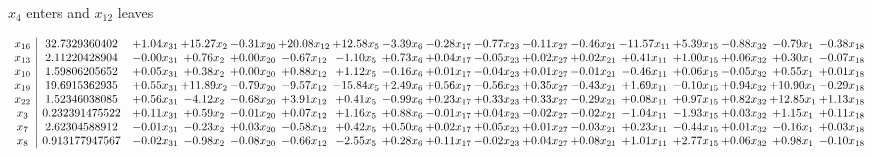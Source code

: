 \documentclass[9pt]{article}
\begin{document}
 $ x_{4} $ enters and $ x_{12} $ leaves 

 \[\begin{array}{c| c c@{\hskip 2pt} c@{\hskip 2pt} c@{\hskip 2pt} c@{\hskip 2pt} c@{\hskip 2pt} c@{\hskip 2pt} c@{\hskip 2pt} c@{\hskip 2pt} c@{\hskip 2pt} c@{\hskip 2pt} c@{\hskip 2pt} c@{\hskip 2pt} c@{\hskip 2pt} c@{\hskip 2pt} c@{\hskip 2pt} }
 x_{16}   &  32.7329360402 & +  1.04 x_{31} & + 15.27 x_{2} & -0.31 x_{20} & + 20.08 x_{12} & + 12.58 x_{5} & -3.39 x_{6} & -0.28 x_{17} & -0.77 x_{23} & -0.11 x_{27} & -0.46 x_{21} & -11.57 x_{11} & +  5.39 x_{15} & -0.88 x_{32} & -0.79 x_{1} & -0.38 x_{18}\\
 x_{13}   &  2.11220428904 & -0.00 x_{31} & +  0.76 x_{2} & +  0.00 x_{20} & -0.67 x_{12} & -1.10 x_{5} & +  0.73 x_{6} & +  0.04 x_{17} & -0.05 x_{23} & +  0.02 x_{27} & +  0.02 x_{21} & +  0.41 x_{11} & +  1.00 x_{15} & +  0.06 x_{32} & +  0.30 x_{1} & -0.07 x_{18}\\
 x_{10}   &  1.59806205652 & +  0.05 x_{31} & +  0.38 x_{2} & +  0.00 x_{20} & +  0.88 x_{12} & +  1.12 x_{5} & -0.16 x_{6} & +  0.01 x_{17} & -0.04 x_{23} & +  0.01 x_{27} & -0.01 x_{21} & -0.46 x_{11} & +  0.06 x_{15} & -0.05 x_{32} & +  0.55 x_{1} & +  0.01 x_{18}\\
 x_{19}   &  19.6915362935 & +  0.55 x_{31} & + 11.89 x_{2} & -0.79 x_{20} & -9.57 x_{12} & -15.84 x_{5} & +  2.49 x_{6} & +  0.56 x_{17} & -0.56 x_{23} & +  0.35 x_{27} & -0.43 x_{21} & +  1.69 x_{11} & -0.10 x_{15} & +  0.94 x_{32} & + 10.90 x_{1} & -0.29 x_{18}\\
 x_{22}   &  1.52346038085 & +  0.56 x_{31} & -4.12 x_{2} & -0.68 x_{20} & +  3.91 x_{12} & +  0.41 x_{5} & -0.99 x_{6} & +  0.23 x_{17} & +  0.33 x_{23} & +  0.33 x_{27} & -0.29 x_{21} & +  0.08 x_{11} & +  0.97 x_{15} & +  0.82 x_{32} & + 12.85 x_{1} & +  1.13 x_{18}\\
 x_{3}   &  0.232391475522 & +  0.11 x_{31} & +  0.59 x_{2} & -0.01 x_{20} & +  0.07 x_{12} & +  1.16 x_{5} & +  0.88 x_{6} & -0.01 x_{17} & +  0.04 x_{23} & -0.02 x_{27} & -0.02 x_{21} & -1.04 x_{11} & -1.93 x_{15} & +  0.03 x_{32} & +  1.15 x_{1} & +  0.11 x_{18}\\
 x_{7}   &  2.62304588912 & -0.01 x_{31} & -0.23 x_{2} & +  0.03 x_{20} & -0.58 x_{12} & +  0.42 x_{5} & +  0.50 x_{6} & +  0.02 x_{17} & +  0.05 x_{23} & +  0.01 x_{27} & -0.03 x_{21} & +  0.23 x_{11} & -0.44 x_{15} & +  0.01 x_{32} & -0.16 x_{1} & +  0.03 x_{18}\\
 x_{8}   &  0.913177947567 & -0.02 x_{31} & -0.98 x_{2} & -0.08 x_{20} & -0.66 x_{12} & -2.55 x_{5} & +  0.28 x_{6} & +  0.11 x_{17} & -0.02 x_{23} & +  0.04 x_{27} & +  0.08 x_{21} & +  1.01 x_{11} & +  2.77 x_{15} & +  0.06 x_{32} & +  0.98 x_{1} & -0.10 x_{18}\\

\end{array}\]
\end{document}
